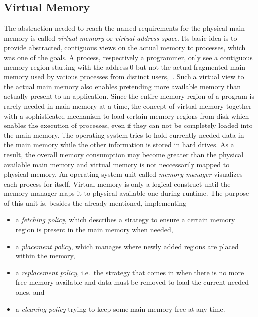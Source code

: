 \subsection{Virtual Memory}
The abstraction needed to reach the named requirements for the physical main memory is called \textit{virtual memory} or \textit{virtual address space}.
Its basic idea is to provide abstracted, contiguous views on the actual memory to processes, which was one of the goals.
A process, respectively a programmer, only see a contiguous memory region starting with the address 0 but not the actual fragmented main memory used by various processes from distinct users\cite{mandl2014Grundkurs},~\cite{brause2017betriebssysteme}.
Such a virtual view to the actual main memory also enables pretending more available memory than actually present to an application.
Since the entire memory region of a program is rarely needed in main memory at a time, the concept of virtual memory together with a sophisticated mechanism to load certain memory regions from disk which enables the execution of processes, even if they can not be completely loaded into the main memory.
The operating system tries to hold currently needed data in the main memory while the other information is stored in hard drives.
As a result, the overall memory consumption may become greater than the physical available main memory and virtual memory is not neccessarily mapped to physical memory\cite{mandl2014Grundkurs}.
An operating system unit called \textit{memory manager} visualizes each process for itself.
Virtual memory is only a logical construct until the memory manager maps it to physical available one during runtime.
The purpose of this unit is, besides the already mentioned, implementing
\begin{itemize}
    \item a \textit{fetching policy}, which describes a strategy to ensure a certain memory region is present in the main memory when needed,
    \item a \textit{placement policy}, which manages where newly added regions are placed within the memory,
    \item a \textit{replacement policy}, i.e.\ the strategy that comes in when there is no more free memory available and data must be removed to load the current needed ones, and
    \item a \textit{cleaning policy} trying to keep some main memory free at any time\cite{mandl2014Grundkurs}.
\end{itemize}
